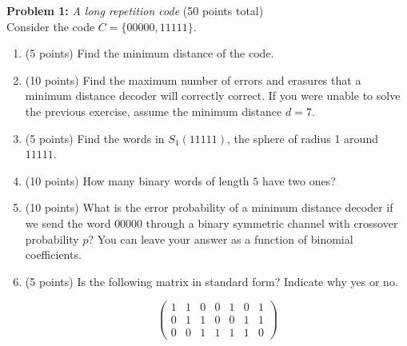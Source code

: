 \noindent \textbf{Problem 1:} \emph{A long repetition code} (50 points total)\\
Consider the code $C=\{00000,11111\}$.
\begin{enumerate}
\item (5 points) Find the minimum distance of the code. 

\noindent{}
\item (10 points) Find the maximum number of errors and erasures that a minimum distance decoder will correctly correct. If you were unable to solve the previous exercise, assume the minimum distance $d=7$.

\noindent{}

\item (5 points) Find the words in $S_1(11111)$, the sphere of radius 1 around $11111$.

\noindent{}

\item (10 points) How many binary words of length $5$ have two ones?

\noindent{}\item (10 points) What is the error probability of a minimum distance decoder if we send the word $00000$ through a binary symmetric channel with crossover probability $p$? You can leave your answer as a function of binomial coefficients.

\noindent{}
\item (5 points) Is the following matrix in standard form? Indicate why yes or no.

$$
\begin{pmatrix}
1 & 1 & 0 & 0 & 1 & 0 & 1\\
0 & 1 & 1 & 0 & 0 & 1 & 1\\
0 & 0 & 1 & 1 & 1 & 1 & 0 
\end{pmatrix}
$$

\noindent{}

\end{enumerate}



